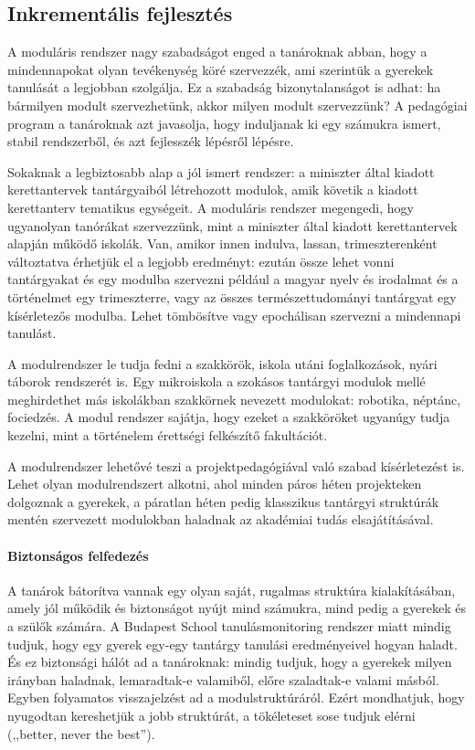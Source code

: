 \subsection{Inkrementális fejlesztés}
A moduláris rendszer nagy szabadságot enged a tanároknak abban, hogy a mindennapokat olyan tevékenység köré szervezzék, ami szerintük a gyerekek tanulását a legjobban szolgálja. Ez a szabadság bizonytalanságot is adhat: ha bármilyen modult szervezhetünk, akkor milyen modult szervezzünk? A pedagógiai program a tanároknak azt javasolja, hogy induljanak ki egy számukra ismert, stabil rendszerből, és azt fejlesszék lépésről lépésre.

Sokaknak a legbiztosabb alap a jól ismert rendszer: a miniszter által kiadott kerettantervek tantárgyaiból létrehozott modulok, amik követik a kiadott kerettanterv tematikus egységeit. A moduláris rendszer megengedi, hogy ugyanolyan tanórákat szervezzünk, mint a miniszter által kiadott kerettantervek alapján működő iskolák. Van, amikor innen indulva, lassan, trimeszterenként változtatva érhetjük el a legjobb eredményt: ezután össze lehet vonni tantárgyakat és egy modulba szervezni például a magyar nyelv és irodalmat és a történelmet egy trimeszterre, vagy az összes természettudományi tantárgyat egy kísérletezős modulba. Lehet tömbösítve vagy epochálisan szervezni a mindennapi tanulást.

A modulrendszer le tudja fedni a szakkörök, iskola utáni foglalkozások, nyári táborok rendszerét is. Egy mikroiskola a szokásos tantárgyi modulok mellé meghirdethet más iskolákban szakkörnek nevezett modulokat: robotika, néptánc, fociedzés. A modul rendszer sajátja, hogy ezeket a szakköröket ugyanúgy tudja kezelni, mint a történelem érettségi felkészítő fakultációt.

A modulrendszer lehetővé teszi a projektpedagógiával való szabad kísérletezést is. Lehet olyan modulrendszert alkotni, ahol minden páros héten projekteken dolgoznak a gyerekek, a páratlan héten pedig klasszikus tantárgyi struktúrák mentén szervezett modulokban haladnak az akadémiai tudás elsajátításával.

\paragraph{Biztonságos felfedezés}
A tanárok bátorítva vannak egy olyan saját, rugalmas struktúra kialakításában, amely jól működik és biztonságot nyújt mind számukra, mind pedig a gyerekek és a szülők számára. A Budapest School tanulásmonitoring rendszer miatt mindig tudjuk, hogy egy gyerek egy-egy tantárgy tanulási eredményeivel hogyan haladt. És ez biztonsági hálót ad a tanároknak: mindig tudjuk, hogy a gyerekek milyen irányban haladnak, lemaradtak-e valamiből, előre szaladtak-e valami másból. Egyben folyamatos visszajelzést ad a modulstruktúráról. Ezért mondhatjuk, hogy nyugodtan kereshetjük a jobb struktúrát, a tökéleteset sose tudjuk elérni (,,better, never the best'').